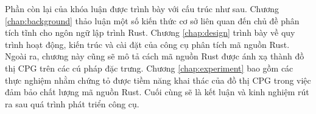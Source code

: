 Phần còn lại của khóa luận được trình bày với cấu trúc như sau.
Chương \ref{chap:background} thảo luận một số kiến thức cơ sở liên quan đến chủ đề phân tích tĩnh cho ngôn ngữ lập trình Rust.
Chương \ref{chap:design} trình bày về quy trình hoạt động, kiến trúc và cài đặt của công cụ phân tích mã nguồn Rust.
Ngoài ra, chương này cũng sẽ mô tả cách mã nguồn Rust được ánh xạ thành đồ thị CPG trên các cú pháp đặc trưng.
Chương \ref{chap:experiment} bao gồm các thực nghiệm nhằm chứng tỏ được tiềm năng khai thác của đồ thị CPG trong việc đảm bảo chất lượng mã nguồn Rust.
Cuối cùng sẽ là kết luận và kinh nghiệm rút ra sau quá trình phát triển công cụ.

